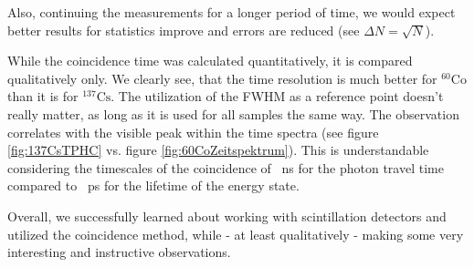 Also, continuing the measurements for a longer period of time, we would expect better results for statistics improve and errors are reduced (see $\Delta N = \sqrt{N}$).
%
\par
%
While the coincidence time was calculated quantitatively, it is compared qualitatively only.
We clearly see, that the time resolution is much better for $^{60}\text{Co}$ than it is for $^{137}\text{Cs}$.
The utilization of the FWHM as a reference point doesn't really matter, as long as it is used for all samples the same way.
The observation correlates with the visible peak within the time spectra (see figure \ref{fig:137CsTPHC} vs. figure \ref{fig:60CoZeitspektrum}).
This is understandable considering the timescales of the coincidence of \SI{}{\nano\second} for the photon travel time compared to \SI{}{\pico\second} for the lifetime of the energy state.
%
\par
%
Overall, we successfully learned about working with scintillation detectors and utilized the coincidence method, while - at least qualitatively - making some very interesting and instructive observations.
